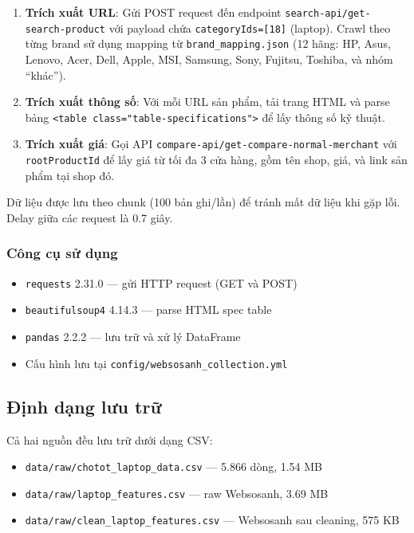\begin{enumerate}[noitemsep]
    \item \textbf{Trích xuất URL}: Gửi POST request đến endpoint \texttt{search-api/get-search-product} với payload chứa \texttt{categoryIds=[18]} (laptop). Crawl theo từng brand sử dụng mapping từ \texttt{brand\_mapping.json} (12 hãng: HP, Asus, Lenovo, Acer, Dell, Apple, MSI, Samsung, Sony, Fujitsu, Toshiba, và nhóm ``khác'').
    \item \textbf{Trích xuất thông số}: Với mỗi URL sản phẩm, tải trang HTML và parse bảng \texttt{<table class="table-specifications">} để lấy thông số kỹ thuật.
    \item \textbf{Trích xuất giá}: Gọi API \texttt{compare-api/get-compare-normal-merchant} với \texttt{rootProductId} để lấy giá từ tối đa 3 cửa hàng, gồm tên shop, giá, và link sản phẩm tại shop đó.
\end{enumerate}

Dữ liệu được lưu theo chunk (100 bản ghi/lần) để tránh mất dữ liệu khi gặp lỗi. Delay giữa các request là 0.7 giây.

\subsubsection{Công cụ sử dụng}

\begin{itemize}[noitemsep]
    \item \texttt{requests} 2.31.0 --- gửi HTTP request (GET và POST)
    \item \texttt{beautifulsoup4} 4.14.3 --- parse HTML spec table
    \item \texttt{pandas}\cite{mckinney2010pandas} 2.2.2 --- lưu trữ và xử lý DataFrame
    \item Cấu hình lưu tại \texttt{config/websosanh\_collection.yml}
\end{itemize}

\subsection{Định dạng lưu trữ}

Cả hai nguồn đều lưu trữ dưới dạng CSV:
\begin{itemize}[noitemsep]
    \item \texttt{data/raw/chotot\_laptop\_data.csv} --- 5.866 dòng, 1.54 MB
    \item \texttt{data/raw/laptop\_features.csv} --- raw Websosanh, 3.69 MB
    \item \texttt{data/raw/clean\_laptop\_features.csv} --- Websosanh sau cleaning, 575 KB
\end{itemize}


